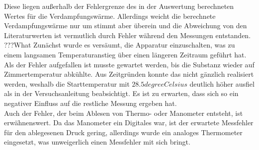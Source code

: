 Diese liegen außerhalb der Fehlergrenze des in der Auswertung berechneten Wertes für die 
Verdampfungswärme. Allerdings weicht die berechnete Verdampfungswärme nur um  stimmt aber überein und die Abweichung von den 
Literaturwerten ist vermutlich durch Fehler während den Messungen entstanden. ???What
Zunächst wurde es versäumt, die Apparatur einzuschalten, was zu einem langsamen Temperaturanstieg über einen längeren Zeitraum geführt hat. Als der Fehler aufgefallen
ist musste gewartet werden, bis die Substanz wieder auf Zimmertemperatur abkühlte. Aus Zeitgründen konnte das nicht gänzlich realisiert werden, weshalb die Starttemperatur 
mit $ 28.5 \si{degreeCelsius}$ deutlich höher ausfiel als in der Versuchsanleitung beabsichtigt. Es ist zu erwarten, dass sich so ein negativer Einfluss auf die restliche Messung
ergeben hat. \\
Auch der Fehler, der beim Ablesen von Thermo- oder Manometer entsteht, ist erwähnenswert. Da das Manometer ein Digitales war, ist der erwartete Messfehler für den ablegesenen 
Druck gering, allerdings wurde ein analoges Thermometer eingesetzt, was unweigerlich einen Messfehler mit sich bringt.

